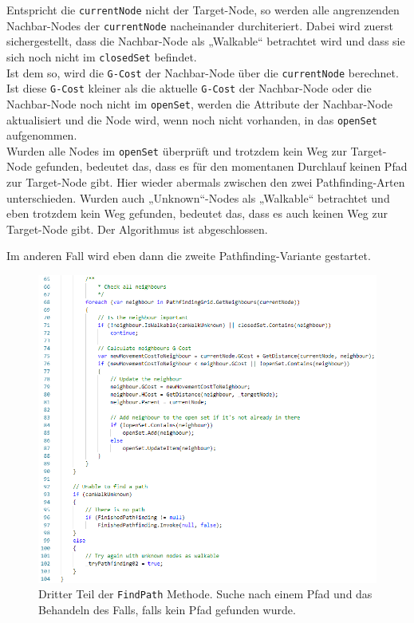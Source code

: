 \documentclass[a4paper,12pt]{article}
\newcommand{\code}{\texttt}
\begin{document}
Entspricht die \code{currentNode} nicht der Target-Node, so werden alle angrenzenden Nachbar-Nodes der \code{currentNode} nacheinander durchiteriert. Dabei wird zuerst sichergestellt, dass die Nachbar-Node als „Walkable“ betrachtet wird und dass sie sich noch nicht im \code{closedSet} befindet.
\\[0.4cm]
Ist dem so, wird die \code{G-Cost} der Nachbar-Node über die \code{currentNode} berechnet. Ist diese \code{G-Cost} kleiner als die aktuelle \code{G-Cost} der Nachbar-Node oder die Nachbar-Node noch nicht im \code{openSet}, werden die Attribute der Nachbar-Node aktualisiert und die Node wird, wenn noch nicht vorhanden, in das \code{openSet} aufgenommen.
\\[0.4cm]
Wurden alle Nodes im \code{openSet} überprüft und trotzdem kein Weg zur Target-Node gefunden, bedeutet das, dass es für den momentanen Durchlauf keinen Pfad zur Target-Node gibt. Hier wieder abermals zwischen den zwei Pathfinding-Arten unterschieden. Wurden auch „Unknown“-Nodes als „Walkable“ betrachtet und eben trotzdem kein Weg gefunden, bedeutet das, dass es auch keinen Weg zur Target-Node gibt. Der Algorithmus ist abgeschlossen. 

Im anderen Fall wird eben dann die zweite Pathfinding-Variante gestartet.
\begin{figure}[H]
    \centering
    \includegraphics[width=1\linewidth]{Bilder/Aufgabe3/Pathfinding_03.png}
    \caption{Dritter Teil der \code{FindPath} Methode. Suche nach einem Pfad und das Behandeln des Falls, falls kein Pfad gefunden wurde.}
\end{figure}
\end{document}
